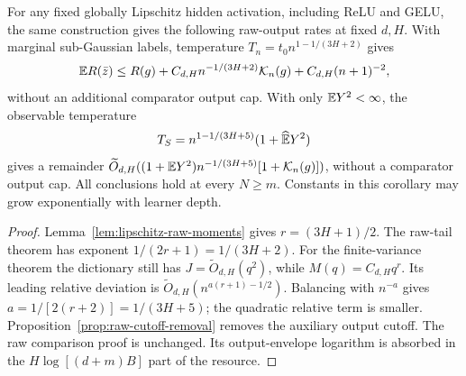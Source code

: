 \begin{corollary}
\label{cor:raw-general-lipschitz}
For any fixed globally Lipschitz hidden activation, including ReLU and
GELU, the same construction gives the following raw-output rates at
fixed $d,H$. With marginal sub-Gaussian labels, temperature
$T_n=t_0n^{1-1/(3H+2)}$ gives
\[
 \mathbb E R(\bar z)\le R(g)+C_{d,H}n^{-1/(3H+2)}\mathcal K_n(g)
                                   +C_{d,H}(n+1)^{-2},
\]
without an additional comparator output cap.
With only $\mathbb E Y^2<\infty$, the observable temperature
\[
 T_S=n^{1-1/(3H+5)}(1+\widehat{\mathbb E}Y^2)
\]
gives a remainder
$\widetilde O_{d,H}((1+\mathbb E Y^2)n^{-1/(3H+5)}[1+\mathcal K_n(g)])$,
without a comparator output cap. All conclusions hold at every
$N\ge m$. Constants in this corollary may grow exponentially with
learner depth.
\end{corollary}
\begin{proof}
Lemma~\ref{lem:lipschitz-raw-moments} gives
$r=(3H+1)/2$. The raw-tail theorem has exponent
$1/(2r+1)=1/(3H+2)$. For the finite-variance theorem the dictionary
still has $J=\widetilde O_{d,H}(q^2)$, while $M(q)=C_{d,H}q^r$.
Its leading relative deviation is
$\widetilde O_{d,H}(n^{a(r+1)-1/2})$. Balancing with $n^{-a}$ gives
$a=1/[2(r+2)]=1/(3H+5)$; the quadratic relative term is smaller.
Proposition~\ref{prop:raw-cutoff-removal} removes the auxiliary output cutoff. The raw comparison proof is unchanged. Its output-envelope logarithm
is absorbed in the $H\log[(d+m)B]$ part of the resource.
\end{proof}
